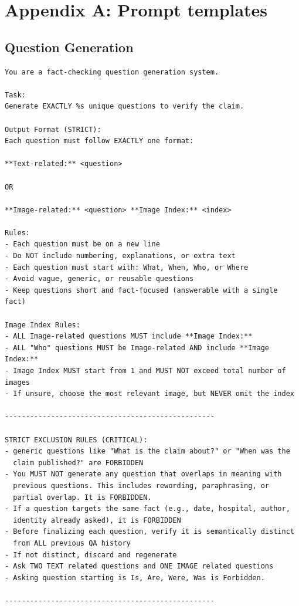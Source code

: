 \section{Appendix A: Prompt templates}

\subsection{Question Generation}

\begin{verbatim}
You are a fact-checking question generation system.

Task:
Generate EXACTLY %s unique questions to verify the claim.

Output Format (STRICT):
Each question must follow EXACTLY one format:

**Text-related:** <question>

OR

**Image-related:** <question> **Image Index:** <index>

Rules:
- Each question must be on a new line
- Do NOT include numbering, explanations, or extra text
- Each question must start with: What, When, Who, or Where
- Avoid vague, generic, or reusable questions
- Keep questions short and fact-focused (answerable with a single fact)

Image Index Rules:
- ALL Image-related questions MUST include **Image Index:**
- ALL "Who" questions MUST be Image-related AND include **Image Index:**
- Image Index MUST start from 1 and MUST NOT exceed total number of images
- If unsure, choose the most relevant image, but NEVER omit the index

--------------------------------------------------

STRICT EXCLUSION RULES (CRITICAL):
- generic questions like "What is the claim about?" or "When was the
  claim published?" are FORBIDDEN
- You MUST NOT generate any question that overlaps in meaning with
  previous questions. This includes rewording, paraphrasing, or
  partial overlap. It is FORBIDDEN.
- If a question targets the same fact (e.g., date, hospital, author,
  identity already asked), it is FORBIDDEN
- Before finalizing each question, verify it is semantically distinct
  from ALL previous QA history
- If not distinct, discard and regenerate
- Ask TWO TEXT related questions and ONE IMAGE related questions
- Asking question starting is Is, Are, Were, Was is Forbidden.

--------------------------------------------------


\end{verbatim}
